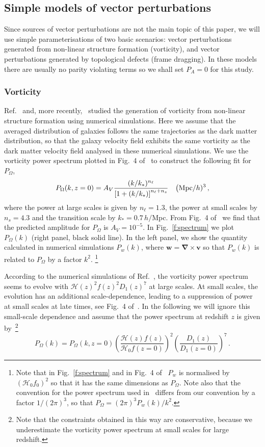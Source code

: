 \documentclass[a4paper,twocolumn,aps,prd,nolongbibliography,superscriptaddress,showpacs,showkeys,amsmath,amssymb,floatfix,nofootinbib]{revtex4-1}
\renewcommand{\[}{\begin{equation}}
\renewcommand{\]}{\end{equation}}
\newcommand{\Hcal}{\mathcal{H}}
\begin{document}
\subsection{Simple models of vector perturbations}
\label{sec:models}

Since sources of vector perturbations are not the main topic of this paper, we will  use simple
parameterisations of two basic scenarios: vector perturbations generated from non-linear structure formation (vorticity), and
vector perturbations generated by topological defects (frame dragging). In these models there are usually no parity violating terms so we shall set $P_A=0$ for this study.

\subsubsection{Vorticity}

Ref.~\cite{Pueblas:2008uv} and, more recently,~\cite{Zhu:2017vtj} studied the generation of vorticity from non-linear structure formation using numerical simulations. Here we assume that the averaged distribution of galaxies follows the same trajectories as the dark matter distribution, so that the galaxy velocity field exhibits the same vorticity as the dark matter velocity field analysed in these numerical simulations. We use the vorticity power spectrum plotted in Fig.\ 4 of~\cite{Pueblas:2008uv} to construct the following fit for $P_\Omega$,
\[
P_\Omega (k,z=0)=A_V \frac{(k/k_*)^{n_\ell}}{\left[ 1+ (k/k_*) \right]^{n_\ell+n_s}}\quad \big({\rm Mpc}/h)^3\, , \label{Pom1343}
\]
where the power at large scales is given by $n_\ell=1.3$, the power at small scales by $n_s=4.3$ and the transition scale by $k_*=0.7\,h/$Mpc. From Fig.\ 4 of~\cite{Pueblas:2008uv} we find that the predicted amplitude for $P_\Omega$ is $A_V=10^{-5}$. In Fig.~\ref{f:spectrum} we plot $P_\Omega(k)$ (right panel, black solid line). In the left panel, we show the quantity calculated in numerical simulations $P_w(k)$, where $\boldsymbol{w}=\boldsymbol{\nabla}\times\boldsymbol{v}$ so that   $P_w(k)$ is related to $P_\Omega$ by a factor $k^2$.%
\footnote{Note that in Fig.~\ref{f:spectrum} and in Fig.\ 4 of~\cite{Pueblas:2008uv} $P_w$ is normalised by $(\mathcal{H}_0f_0)^2$ so that it has the same dimensions as $P_\Omega$. Note also that the convention for the power spectrum used in~\cite{Pueblas:2008uv} differs from our convention by a factor $1/(2\pi)^3$, so that $P_\Omega=(2\pi)^3 P_w(k)/k^2$.} %

According to the numerical simulations of Ref.~\cite{Pueblas:2008uv}, the vorticity power spectrum seems to evolve with $\Hcal(z)^2 f(z)^2 D_1(z)^7$ at large scales. At small scales, the evolution has an additional scale-dependence, leading to a suppression of power at small scales at late times, see Fig.\ 4 of~\cite{Pueblas:2008uv}. In the following we will ignore this small-scale dependence and assume that the power spectrum at redshift $z$ is given by~\footnote{Note that the constraints obtained in this way are conservative, because we underestimate the vorticity power spectrum at small scales for large redshift.}
\[
P_\Omega (k)=P_\Omega (k,z=0)\left(\frac{\Hcal(z)f(z)}{\Hcal_0f(z=0)}\right)^2\left(\frac{D_1(z)}{D_1(z=0)}\right)^7\, . \label{Pevol}
\]
\end{document}
